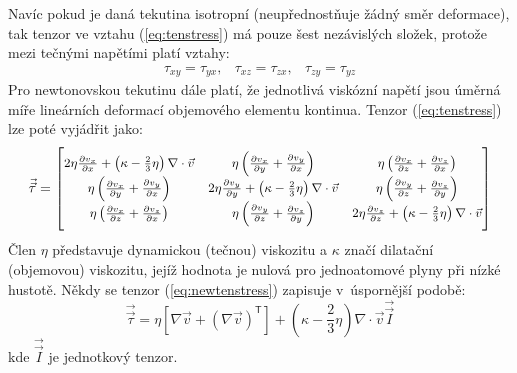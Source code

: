 \noindent  Navíc pokud je daná tekutina isotropní (neupřednostňuje žádný směr deformace), tak tenzor ve vztahu (\ref{eq:tenstress}) má pouze šest nezávislých složek, protože mezi tečnými napětími platí vztahy:
\begin{equation}
    \begin{array}{ccc}
      \tau_{xy} = \tau_{yx}, & \tau_{xz} = \tau_{zx}, & \tau_{zy} = \tau_{yz}
      \end{array}
  	\label{eq:dept}
\end{equation} 
Pro newtonovskou tekutinu dále platí, že jednotlivá viskózní napětí jsou úměrná míře lineárních deformací objemového elementu kontinua. Tenzor (\ref{eq:tenstress}) lze poté vyjádřit jako: 
\begin{equation}
	\small
    \vec{\vec{\tau}} = 
    \begin{bmatrix}
      2\eta\frac{\partial v_{x}}{\partial x} + \left( \kappa - \frac{2}{3} \eta  \right)  \nabla \cdot \vec{v} & \eta \left( \frac{\partial v_{x}}{\partial y} + \frac{\partial v_{y}}{\partial x} \right) & \eta \left( \frac{\partial v_{x}}{\partial z} + \frac{\partial v_{z}}{\partial x} \right)\\ 
      \eta \left( \frac{\partial v_{x}}{\partial y} + \frac{\partial v_{y}}{\partial x} \right) & 2\eta\frac{\partial v_{y}}{\partial y} + \left( \kappa - \frac{2}{3} \eta  \right)  \nabla \cdot \vec{v} 
      & \eta \left( \frac{\partial v_{y}}{\partial z} + \frac{\partial v_{z}}{\partial y} \right)\\ 
      \eta \left( \frac{\partial v_{x}}{\partial z} + \frac{\partial v_{z}}{\partial x} \right) & \eta \left( \frac{\partial v_{y}}{\partial z} + \frac{\partial v_{z}}{\partial y} \right)
      & 2\eta\frac{\partial v_{z}}{\partial z} + \left( \kappa - \frac{2}{3} \eta  \right) \nabla \cdot \vec{v}\\ 
    \end{bmatrix}
  	\label{eq:newtenstress}
  	\normalsize
\end{equation} 
Člen $\eta$ představuje dynamickou (tečnou) viskozitu a $\kappa$ značí dilatační (objemovou) viskozitu, jejíž hodnota je nulová pro jednoatomové plyny při nízké hustotě. Někdy se tenzor (\ref{eq:newtenstress}) zapisuje v~úspornější podobě:
\begin{equation}
	\vec{\vec{\tau}} = \eta \left[ \nabla \vec{v} +  \left( \nabla \vec{v} \right)^{\mathsf{T}}\right] +  \left( \kappa -\frac{2}{3} \eta \right) \nabla \cdot \vec{v} \vec{\vec{I}}
	\label{eq:comptenstress}
\end{equation}
kde $\vec{\vec{I}}$ je jednotkový tenzor.

